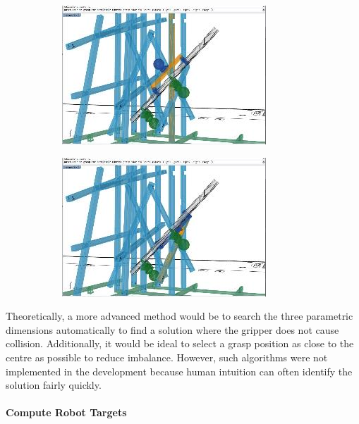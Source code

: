 \documentclass[11pt]{book}
\begin{document}
\begin{figure}[H]
\begin{subfigure}[b]{0.23\textwidth}
\includegraphics[width=\textwidth]{./images/image28.jpeg}
\end{subfigure}
\hfill
\begin{subfigure}[b]{0.23\textwidth}
\centering
\includegraphics[width=\textwidth]{./images/image29.jpeg}
\end{subfigure}
\end{figure}


Theoretically, a more advanced method would be to search the three parametric dimensions automatically to find a solution where the gripper does not cause collision. Additionally, it would be ideal to select a grasp position as close to the centre as possible to reduce imbalance. However, such algorithms were not implemented in the development because human intuition can often identify the solution fairly quickly. 

\paragraph{Compute Robot Targets}
\end{document}
